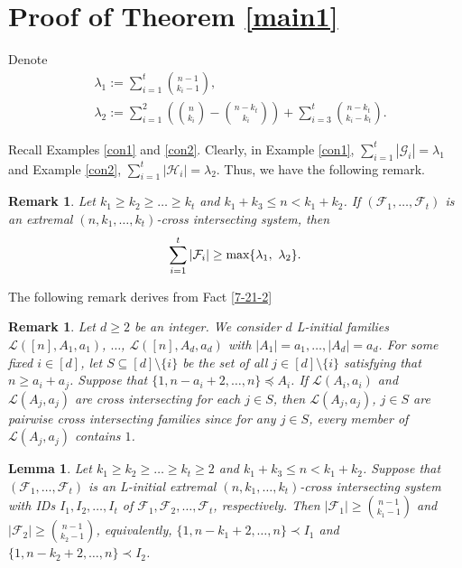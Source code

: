 \documentclass[a4paper,11pt]{article}
\newtheorem{lemma}[theorem]{Lemma}
\newtheorem{remark}[theorem]{Remark}
\begin{document}
\section{Proof of Theorem \ref{main1}}\label{sec3}
Denote
\begin{align*}
&\lambda_1:=\sum_{i=1}^t{n-1\choose k_i-1},\\
&\lambda_2:=\sum_{i=1}^2\left({n\choose k_i}-{n-k_t\choose k_i}\right)+\sum_{i=3}^t{{n-k_t\choose k_i-k_t}}.
\end{align*}

Recall Examples \ref{con1} and \ref{con2}. Clearly, in Example \ref{con1},
$\sum_{i=1}^t|\mathcal{G}_i|=\lambda_1$ and Example \ref{con2},
$\sum_{i=1}^t|\mathcal{H}_i|=\lambda_2$. Thus,
we have the following remark.

\begin{remark}\label{NEW2}
Let $k_1\geq k_2\geq\dots\geq k_t$ and $k_1+k_3\leq n <k_1+k_2$.
If $(\mathcal{F}_1, \dots, \mathcal{F}_t)$ is an  extremal $(n, k_1, \dots, k_t)$-cross intersecting system, then
\begin{equation*}
\sum_{i=1}^t|\mathcal{F}_i|\geq \textup{max}\{\lambda_1, \,\, \lambda_2\}.
\end{equation*}
\end{remark}


The following remark derives from Fact \ref{7-21-2}
\begin{remark}\label{remark2.20+}
Let $d\geq 2$ be an integer. We consider $d$ L-initial families $\mathcal{L}([n], A_1, a_1)$, $\dots$, $\mathcal{L}([n], A_d, a_d)$ with $|A_1|=a_1, \dots, |A_d|=a_d$. For some fixed $i\in [d]$, let $S\subseteq [d]\setminus \{i\}$ be the set of all $j\in [d]\setminus \{i\}$ satisfying that $n\geq a_i+a_j$. Suppose that $\{1, n-a_i+2, \dots, n\}\preceq  A_i$. If $\mathcal{L}(A_i, a_i)$ and $\mathcal{L}(A_j, a_j)$ are cross intersecting for each $j\in S$, then
$\mathcal{L}(A_j, a_j)$, $j\in S$ are pairwise cross intersecting families since for any $j\in S$, every member of $\mathcal{L}(A_j, a_j)$ contains $1$.
\end{remark}






\begin{lemma}\label{>}
Let $k_1\geq k_2\geq\dots\geq k_t\geq 2$ and $k_1+k_3\leq n <k_1+k_2$.
Suppose that $(\mathcal{F}_1, \dots, \mathcal{F}_t)$ is an L-initial extremal $(n, k_1, \dots, k_t)$-cross intersecting system with IDs $I_1, I_2, \dots, I_t$  of $\mathcal{F}_1, \mathcal{F}_2, \dots, \mathcal{F}_t$, respectively. Then
 $|\mathcal{F}_1|\geq {n-1\choose k_1-1}$ and $|\mathcal{F}_2|\geq {n-1\choose k_2-1}$, equivalently, $\{1, n-k_1+2, \dots, n\} \prec I_1$ and $\{1, n-k_2+2, \dots, n\} \prec I_2$.
\end{lemma}
\end{document}
